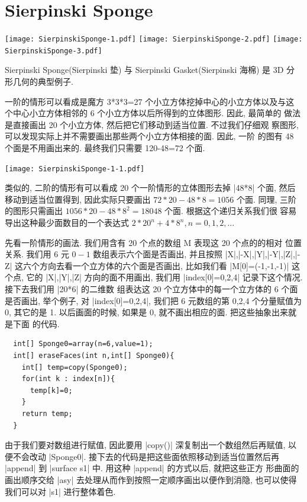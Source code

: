 \documentclass[nofonts,CJKnormalspaces]{ctexbook}[2009/05/20]
\begin{document}
\section{Sierpinski Sponge}
\begin{center}
  \texttt{[image: SierpinskiSponge-1.pdf]}
  \texttt{[image: SierpinskiSponge-2.pdf]}
  \texttt{[image: SierpinskiSponge-3.pdf]}
\end{center}%
Sierpinski Sponge(Sierpinski 垫) 与 Sierpinski Gasket(Sierpinski 海棉)
是 3D 分形几何的典型例子.

一阶的情形可以看成是魔方 3*3*3=27 个小立方体挖掉中心的小立方体以及与这
个中心小立方体相邻的 6 个小立方体以后所得到的立体图形. 因此, 最简单的
做法是直接画出 20 个小立方体, 然后把它们移动到适当位置. 不过我们仔细观
察图形, 可以发现实际上并不需要画出那些两个小立方体相接的面. 因此, 一阶
的图有 48 个面是不用画出来的. 最终我们只需要 120-48=72 个面.
\begin{center}
  \texttt{[image: SierpinskiSponge-1-1.pdf]}
\end{center}%
类似的, 二阶的情形有可以看成 20 个一阶情形的立体图形去掉 |48*8| 个面,
然后移动到适当位置得到, 因此实际只要画出 $72*20-48*8=1056$ 个面. 同理,
三阶的图形只需画出 $1056*20-48*8^2=18048$ 个面. 根据这个递归关系我们很
容易导出这种最少面数目的一个表达式 $2*20^n+4*8^n, n=0,1,2,...$


先看一阶情形的画法. 我们用含有 20 个点的数组 M 表现这 20 个点的的相对
位置关系. 我们用 6 元 $0-1$ 数组表示六个面是否画出, 并且按照
|X|,|-X|,|Y|,|-Y|,|Z|,|-Z| 这六个方向去看一个立方体的六个面是否画出,
比如我们看 |M[0]=(-1,-1,-1)| 这个点, 它的 |X|,|Y|,|Z| 方向的面不用画出,
我们用 |index[0]={0,2,4}| 记录下这个情况. 接下去我们用 |20*6| 的二维数
组表达这 20 个立方体中的每一个立方体的 6 个面是否画出, 举个例子, 对
|index[0]={0,2,4}|, 我们把 6 元数组的第 0,2,4 个分量赋值为 0, 其它的是
1. 以后画面的时候, 如果是 0, 就不画出相应的面. 把这些抽象出来就是下面
的代码.
\begin{lstlisting}
  int[] Sponge0=array(n=6,value=1);
  int[] eraseFaces(int n,int[] Sponge0){
    int[] temp=copy(Sponge0);
    for(int k : index[n]){
      temp[k]=0;
    }
    return temp;
  }
\end{lstlisting}
由于我们要对数组进行赋值, 因此要用 |copy()| 深复制出一个数组然后再赋值,
以便不会改动 |Sponge0|. 接下去的代码是把这些面依照移动到适当位置然后再
|append| 到 |surface s1| 中. 用这种 |append| 的方式以后, 就把这些正方
形曲面的画出顺序交给 |asy| 去处理从而作到按照一定顺序画出以便作到消隐,
也可以使得我们可以对 |s1| 进行整体着色.
\end{document}
